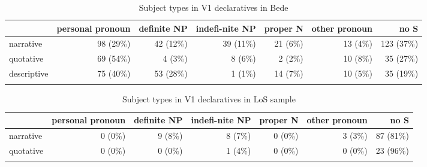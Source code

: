 \documentclass[output=paper,colorlinks,citecolor=brown]{langscibook}
\begin{document}
\begin{table}
\begin{tabularx}{\textwidth}{Xrrrrrr}
\lsptoprule
& \multicolumn{1}{Q}{personal pronoun} & \multicolumn{1}{Q}{definite NP} & \multicolumn{1}{Q}{indefi-nite NP} & \multicolumn{1}{Q}{proper N} & \multicolumn{1}{Q}{other pronoun} & \multicolumn{1}{Q}{no S}\\
\midrule
narrative &   {98 (29\%)} & {42 (12\%)} & { 39 (11\%)} & { 21 (6\%)} & {13 (4\%)} & {123 (37\%)}\\
quotative &  {69 (54\%)} & {4 (3\%)} & { 8 (6\%)} & { 2 (2\%)} & {10 (8\%)} & {35 (27\%)}\\
descriptive &  {75 (40\%)} & {53 (28\%)} & { 1 (1\%)} & { 14 (7\%)} & {10 (5\%)} & {35 (19\%)}\\
\lspbottomrule
\end{tabularx}
\caption{Subject types in V1 declaratives in Bede}
\label{tab:cichosz:9}
\end{table}


\begin{table}
\begin{tabularx}{\textwidth}{Xrrrrrr}
\lsptoprule
& \multicolumn{1}{Q}{personal pronoun} & \multicolumn{1}{Q}{definite NP} & \multicolumn{1}{Q}{indefi-nite NP} & \multicolumn{1}{Q}{proper N} & \multicolumn{1}{Q}{other pronoun} & \multicolumn{1}{Q}{no S}\\
\midrule
narrative & {0 (0\%)} & {9 (8\%)} & { 8 (7\%)} & { 0 (0\%)} & {3 (3\%)} & {87 (81\%)}\\
{quotative} &  {0 (0\%)} & {0 (0\%)} & { 1 (4\%)} & { 0 (0\%)} & {0 (0\%)} & {23 (96\%)}\\
\lspbottomrule
\end{tabularx}
\caption{Subject types in V1 declaratives in LoS sample}
\label{tab:cichosz:10}
\end{table}
\end{document}
